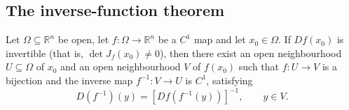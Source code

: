 \subsection{The inverse-function theorem}

\begin{theorem}\label{thm:inverse_function}
Let $\Omega \subseteq \mathbb{R}^n$ be open, let $f: \Omega \to \mathbb{R}^n$ be a $C^1$ map and let $x_0 \in \Omega$. If $Df(x_0)$ is invertible (that is, $\det J_f(x_0) \neq 0$), then there exist an open neighbourhood $U \subseteq \Omega$ of $x_0$ and an open neighbourhood $V$ of $f(x_0)$ such that $f: U \to V$ is a bijection and the inverse map $f^{-1}: V \to U$ is $C^1$, satisfying
\[
D(f^{-1})(y) = [Df(f^{-1}(y))]^{-1}, \qquad y \in V.
\]
\end{theorem}

